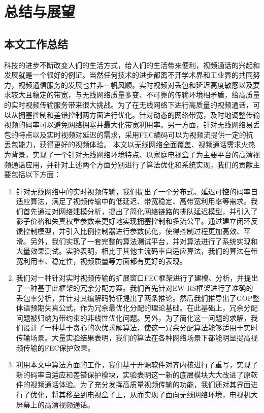 \chapter{总结与展望}
\label{chap:conclusion}

\section{本文工作总结}
科技的进步不断改变人们的生活方式，给人们的生活带来便利，视频通话的兴起和发展就是一个很好的例证。当然任何技术的进步都离不开学术界和工业界的共同努力，视频通信服务的发展也并非一帆风顺。实时视频对丢包和延迟高度敏感以及要求较大且稳定的带宽，与无线网络质量多变、不可靠的传输环境相矛盾，给高质量的实时视频传输服务带来很大挑战。为了在无线网络下进行高质量的视频通话，可以从拥塞控制和差错控制两方面进行优化。针对动态的网络带宽，及时地调整传输视频的码率可以避免网络拥塞并最大化带宽利用率。另一方面，针对无线网络易丢包的特点以及实时视频对延迟的需求，采用FEC编码可以为视频流提供一定的抗丢包能力，获得更好的视频体验。
本文以无线网络全面覆盖、视频通话需求火热为背景，实现了一个针对无线网络环境特点、以家庭电视盒子为主要平台的高清视频通话应用，并针对上述两个方面分别进行了算法优化和系统实现，我们的贡献主要包括以下方面：
\begin{enumerate}
    \item 针对无线网络中的实时视频传输，我们提出了一个分布式、延迟可控的码率自适应算法，满足了视频传输中的低延迟、带宽稳定、高带宽利用率等需求。我们首先通过对网络建模分析，提出了简化网络链路的排队延迟模型，并引入了影子价格和失真权重参数来更好地实现拥塞控制和多流公平。通过建立闭环反馈控制模型，并引入比例控制器进行参数优化，使得控制过程更加高效、平滑。另外，我们实现了一套完整的算法测试平台，并对算法进行了系统实现和大量效果测试。实验表明，相比于其他主流码率自适应算法，我们的算法在带宽利用率、稳定性，视频质量等方面都有更好的表现。
    \item 我们对一种针对实时视频传输的扩展窗口FEC框架进行了建模、分析，并提出了一种基于此框架的冗余分配方案。我们首先针对EW-RS框架进行了准确的丢包率分析，并针对其编解码特征提出了两条推论。然后我们推导出了GOP整体语预期失真公式，作为冗余最优化分配的理论基础。在此基础上，冗余分配问题被归纳为带约束的非线性优化问题。另外，为了简化这一问题的求解，我们设计了一种基于贪心的次优求解算法，使这一冗余分配算法能够适用于实时传输场景。大量实验结果表明，我们的算法在各种网络场景下都能明显提高视频传输的FEC保护效果。
    \item 利用本文中算法方面的工作，我们基于开源软件对齐内核进行了重写，实现了新的码率自适应和差错保护模块，实验表明这一新的底层模块大大改进了原软件的视频通话体验。为了充分发挥高质量视频传输的功能，我们还对其界面进行了优化，将其移至到电视盒子上，从而实现了面向无线网络环境，电视机大屏幕上的高清视频通话。
\end{enumerate}


